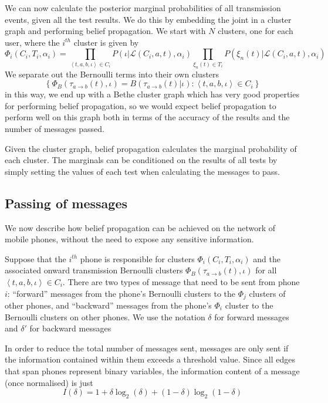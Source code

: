 \documentclass{article}
\begin{document}
We can now calculate the posterior marginal probabilities of all transmission events, given all the test results. We do this by embedding the joint in a cluster graph and performing belief propagation. We start with $N$ clusters, one for each user, where the $i^{th}$ cluster is given by
\begin{equation}
\Phi_i(C_i, T_i,\alpha_i) =
\prod_{\left< t,a,b, \iota \right> \in C_i}
P\left(\iota|\mathcal{L}(C_i,a,t),\alpha_i \right)
\prod_{\xi_{n}(t) \in T_i}
P(\xi_{n}(t)|\mathcal{L}(C_i,a,t),\alpha_i)
\label{ijoint}
\end{equation}
We separate out the Bernoulli terms into their own clusters
\begin{equation}
\left\{ \Phi_{B}(\tau_{a\rightarrow b}(t),\iota) = B(\tau_{a\rightarrow b}(t)|\iota) : \left<t,a,b,\iota\right> \in C_i \right\}
\end{equation}
in this way, we end up with a Bethe cluster graph which has very good properties for performing belief propagation, so we would expect belief propagation to perform well on this graph both in terms of the accuracy of the results and the number of messages passed.

Given the cluster graph, belief propagation calculates the marginal probability of each cluster. The marginals can be conditioned on the results of all tests by simply setting the values of each test when calculating the messages to pass.

\subsection{Passing of messages}

We now describe how belief propagation can be achieved on the network of mobile phones, without the need to expose any sensitive information.

Suppose that the $i^{th}$ phone is responsible for clusters $\Phi_i(C_i,T_i,\alpha_i)$ and the associated onward transmission Bernoulli clusters $\Phi_{B}(\tau_{a\rightarrow b}(t),\iota)$ for all $\left<t,a,b,\iota\right>\in C_i$. There are two types of message that need to be sent from phone $i$: ``forward'' messages from the phone's Bernoulli clusters to the $\Phi_j$ clusters of other phones, and ``backward'' messages from the phone's $\Phi_i$ cluster to the Bernoulli clusters on other phones. We use the notation $\delta$ for forward messages and $\delta'$ for backward messages

In order to reduce the total number of messages sent, messages are only sent if the information contained within them exceeds a threshold value. Since all edges that span phones represent binary variables, the information content of a message (once normalised) is just
\[
I(\delta) = 1 + \delta\log_2(\delta) + (1-\delta)\log_2(1-\delta)
\]
\end{document}
